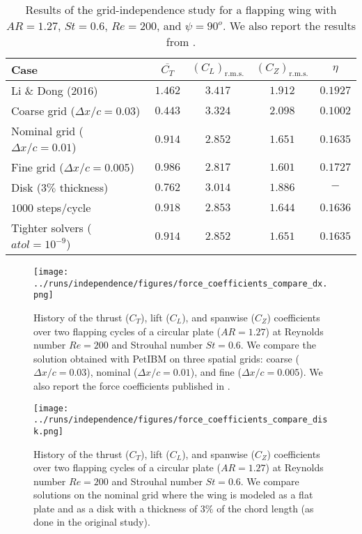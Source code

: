 \begin{table}
  \centering
  \begin{tabular}{lcccc}
    \hline\hline
    Case & $\overline{C_T}$ & $\left( C_L \right)_\text{r.m.s.}$ & $\left( C_Z \right)_\text{r.m.s.}$ & $\eta$ \\
    \hline
    Li \& Dong (2016) & $1.462$ & $3.417$ & $1.912$ & $0.1927$ \\
    Coarse grid ($\Delta x / c = 0.03$) & $0.443$ & $3.324$ & $2.098$ & $0.1002$ \\
    Nominal grid ($\Delta x / c = 0.01$) & $0.914$ & $2.852$ & $1.651$ & $0.1635$ \\
    Fine grid ($\Delta x / c = 0.005$) & $0.986$ & $2.817$ & $1.601$ & $0.1727$ \\
    Disk ($3\%$ thickness) & $0.762$ & $3.014$ & $1.886$ & $-$ \\
    $1000$ steps/cycle & $0.918$ & $2.853$ & $1.644$ & $0.1636$ \\
    Tighter solvers ($atol = 10^{-9}$) & $0.914$ & $2.852$ & $1.651$ & $0.1635$ \\
    \hline\hline
  \end{tabular}
  \caption{Results of the grid-independence study for a flapping wing with $AR = 1.27$, $St = 0.6$, $Re = 200$, and $\psi = 90^o$. We also report the results from \citet{li_dong_2016}.}
  \label{tab:independence_results}
\end{table}

\begin{figure}
  \centering
  \texttt{[image: ../runs/independence/figures/force\_coefficients\_compare\_dx.png]}
  \caption{History of the thrust ($C_T$), lift ($C_L$), and spanwise ($C_Z$) coefficients over two flapping cycles of a circular plate ($AR = 1.27$) at Reynolds number $Re = 200$ and Strouhal number $St = 0.6$. We compare the solution obtained with PetIBM on three spatial grids: coarse ($\Delta x / c = 0.03$), nominal ($\Delta x / c = 0.01$), and fine ($\Delta x / c = 0.005$). We also report the force coefficients published in \citet{li_dong_2016}.}
  \label{fig:independence_force_coefficients_dx}
\end{figure}

\begin{figure}
  \centering
  \texttt{[image: ../runs/independence/figures/force\_coefficients\_compare\_disk.png]}
  \caption{History of the thrust ($C_T$), lift ($C_L$), and spanwise ($C_Z$) coefficients over two flapping cycles of a circular plate ($AR = 1.27$) at Reynolds number $Re = 200$ and Strouhal number $St = 0.6$. We compare solutions on the nominal grid where the wing is modeled as a flat plate and as a disk with a thickness of $3\%$ of the chord length (as done in the original study\supercite{li_dong_2016}).}
  \label{fig:independence_force_coefficients_disk}
\end{figure}


